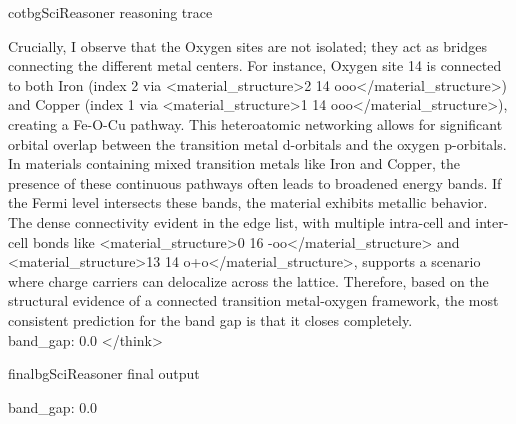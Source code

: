 \begin{appendices}
\begin{fullcotsection}{cotbg}{SciReasoner reasoning trace}
\begin{cotverbatim}
Crucially, I observe that the Oxygen sites are not isolated; they act as bridges connecting the different metal centers. For instance, Oxygen site 14 is connected to both Iron (index 2 via <material_structure>2 14 ooo</material_structure>) and Copper (index 1 via <material_structure>1 14 ooo</material_structure>), creating a Fe-O-Cu pathway. This heteroatomic networking allows for significant orbital overlap between the transition metal d-orbitals and the oxygen p-orbitals. In materials containing mixed transition metals like Iron and Copper, the presence of these continuous pathways often leads to broadened energy bands. If the Fermi level intersects these bands, the material exhibits metallic behavior. The dense connectivity evident in the edge list, with multiple intra-cell and inter-cell bonds like <material_structure>0 16 -oo</material_structure> and <material_structure>13 14 o+o</material_structure>, supports a scenario where charge carriers can delocalize across the lattice. Therefore, based on the structural evidence of a connected transition metal-oxygen framework, the most consistent prediction for the band gap is that it closes completely. \\
{band_gap: 0.0}
</think>
\end{cotverbatim}
\end{fullcotsection}

\vspace{0.6em}

\begin{fullcotsection}{finalbg}{SciReasoner final output}
\begin{cotverbatim}
{band_gap: 0.0}
\end{cotverbatim}
\end{fullcotsection}

\vspace{0.6em}

 
 
 
 

 

 

 

 

 

 

 

 

 

 

 

 

 


\end{appendices}
